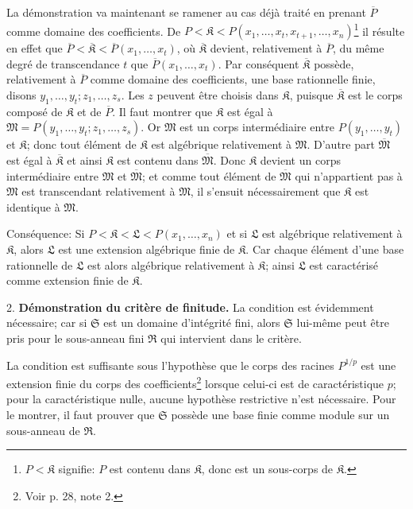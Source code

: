La démonstration va maintenant se ramener au cas déjà traité en prenant $\overline P$ comme domaine des coefficients. De $P<\mathfrak K<P(x_1,\ldots,x_t,x_{t+1},\ldots,x_n)$\footnote{$P<\mathfrak K$ signifie: $P$ est contenu dans $\mathfrak K$, donc est un sous-corps de $\mathfrak K$.} il résulte en effet que $\overline P<\overline{\mathfrak K}<\overline P(x_1,\ldots,x_t)$, où $\overline{\mathfrak K}$ devient, relativement à $\overline P$, du même degré de transcendance $t$ que $\overline P(x_1,\ldots,x_t)$. Par conséquent $\overline{\mathfrak K}$ possède, relativement à $\overline P$ comme domaine des coefficients, une base rationnelle finie, disons $y_1,\ldots,y_t; z_1,\ldots,z_s$. Les $z$ peuvent être choisis dans $\mathfrak K$, puisque $\overline{\mathfrak K}$ est le corps composé de $\mathfrak K$ et de $\overline P$. Il faut montrer que $\mathfrak K$ est égal à $\mathfrak M=P(y_1,\ldots,y_t;z_1,\ldots,z_s)$. Or $\mathfrak M$ est un corps intermédiaire entre $P(y_1,\ldots,y_t)$ et $\mathfrak K$; donc tout élément de $\mathfrak K$ est algébrique relativement à $\mathfrak M$. D'autre part $\overline{\mathfrak M}$ est égal à $\overline{\mathfrak K}$ et ainsi $\mathfrak K$ est contenu dans $\overline{\mathfrak M}$. Donc $\mathfrak K$ devient un corps intermédiaire entre $\mathfrak M$ et $\overline{\mathfrak M}$; et comme tout élément de $\overline{\mathfrak M}$ qui n'appartient pas à $\mathfrak M$ est transcendant relativement à $\mathfrak M$, il s'ensuit nécessairement que $\mathfrak K$ est identique à $\mathfrak M$.

Conséquence: Si $P<\mathfrak K<\mathfrak L<P(x_1,\ldots,x_n)$ et si $\mathfrak L$ est algébrique relativement à $\mathfrak K$, alors $\mathfrak L$ est une extension algébrique finie de $\mathfrak K$. Car chaque élément d'une base rationnelle de $\mathfrak L$ est alors algébrique relativement à $\mathfrak K$; ainsi $\mathfrak L$ est caractérisé comme extension finie de $\mathfrak K$.

2. \textbf{Démonstration du critère de finitude.} La condition est évidemment nécessaire; car si $\mathfrak S$ est un domaine d’intégrité fini, alors $\mathfrak S$ lui-même peut être pris pour le sous-anneau fini $\mathfrak R$ qui intervient dans le critère.

La condition est suffisante sous l'hypothèse que le corps des racines $P^{1/p}$ est une extension finie du corps des coefficients\footnote{Voir p. 28, note 2.} lorsque celui-ci est de caractéristique $p$; pour la caractéristique nulle, aucune hypothèse restrictive n'est nécessaire. Pour le montrer, il faut prouver que $\mathfrak S$ possède une base finie comme module sur un sous-anneau de $\mathfrak R$.

